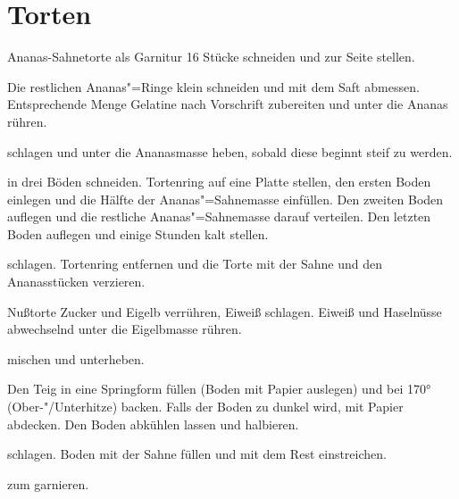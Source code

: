 \section{Torten}

\begin{recipe}{Ananas-Sahnetorte}
  als Garnitur 16 Stücke schneiden und zur Seite stellen.

  Die restlichen Ananas"=Ringe klein schneiden und mit dem Saft abmessen.
  Entsprechende Menge Gelatine nach Vorschrift zubereiten und unter die
  Ananas rühren.

  schlagen und unter die Ananasmasse heben, sobald diese beginnt steif
  zu werden.

  in drei Böden schneiden. Tortenring auf eine Platte stellen, den
  ersten Boden einlegen und die Hälfte der Ananas"=Sahnemasse einfüllen.
  Den zweiten Boden auflegen und die restliche Ananas"=Sahnemasse darauf
  verteilen. Den letzten Boden auflegen und einige Stunden kalt stellen.

  schlagen. Tortenring entfernen und die Torte mit der Sahne und den
  Ananasstücken verzieren.
\end{recipe}



\begin{recipe}{Nußtorte}
  Zucker und Eigelb verrühren, Eiweiß schlagen. Eiweiß und Haselnüsse
  abwechselnd unter die Eigelbmasse rühren.

  mischen und unterheben.

  Den Teig in eine Springform füllen (Boden mit Papier auslegen) und bei
  170° (Ober-"/Unterhitze) backen. Falls der Boden zu dunkel wird, mit
  Papier abdecken. Den Boden abkühlen lassen und halbieren.

  schlagen. Boden mit  der Sahne füllen und mit dem Rest
  einstreichen.

  zum garnieren.  
\end{recipe}



